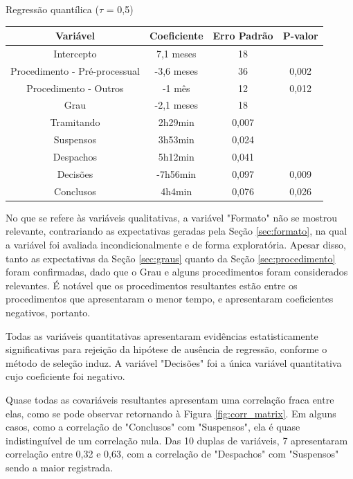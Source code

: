 \begin{modelo}[H]
\centering
\caption{Regressão quantílica ($\tau$ = 0,5)} 
\label{tab:candidate1_0,5}
\begin{tabular}{c|cc|c}
  \hline
\textbf{Variável} & \textbf{Coeficiente} & \textbf{Erro Padrão} & \textbf{P-valor} \\ 
  \hline
  Intercepto & 7,1 meses & 18 & \approx 0 \\ 
  Procedimento - Pré-processual & -3,6 meses & 36 & 0,002 \\ 
  Procedimento - Outros & -1 mês & 12 & 0,012 \\ 
  Grau & -2,1 meses & 18 & \approx 0 \\ 
  Tramitando & 2h29min & 0,007 & \approx 0 \\ 
  Suspensos & 3h53min & 0,024 & \approx 0 \\ 
  Despachos & 5h12min & 0,041 & \approx 0 \\ 
  Decisões & -7h56min & 0,097 & 0,009 \\ 
  Conclusos & 4h4min & 0,076 & 0,026 \\
   \hline
\end{tabular}
\end{modelo}

No que se refere às variáveis qualitativas, a variável "Formato" não se mostrou relevante, contrariando as expectativas geradas pela Seção \ref{sec:formato}, na qual a variável foi avaliada incondicionalmente e de forma exploratória. Apesar disso, tanto as expectativas da Seção \ref{sec:graus} quanto da Seção \ref{sec:procedimento} foram confirmadas, dado que o Grau e alguns procedimentos foram considerados relevantes. É notável que os procedimentos resultantes estão entre os procedimentos que apresentaram o menor tempo, e apresentaram coeficientes negativos, portanto.

Todas as variáveis quantitativas apresentaram evidências estatisticamente significativas para rejeição da hipótese de ausência de regressão, conforme o método de seleção induz. A variável "Decisões" foi a única variável quantitativa cujo coeficiente foi negativo.

Quase todas as covariáveis resultantes apresentam uma correlação fraca entre elas, como se pode observar retornando à Figura \ref{fig:corr_matrix}. Em alguns casos, como a correlação de "Conclusos" com "Suspensos", ela é quase indistinguível de um correlação nula. Das 10 duplas de variáveis, 7 apresentaram correlação entre 0,32 e 0,63, com a correlação de "Despachos" com "Suspensos" sendo a maior registrada.

